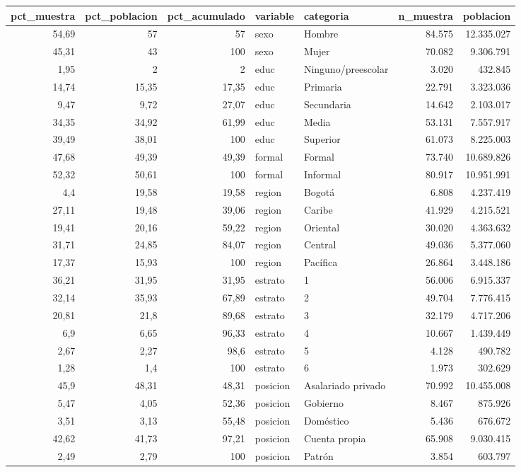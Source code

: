 \begin{tabular}{rrrllrr}
\toprule
pct\_muestra & pct\_poblacion & pct\_acumulado & variable & categoria & n\_muestra & poblacion \\
\midrule
54,69 & 57 & 57 & sexo & Hombre & 84.575 & 12.335.027 \\
45,31 & 43 & 100 & sexo & Mujer & 70.082 & 9.306.791 \\
1,95 & 2 & 2 & educ & Ninguno/preescolar & 3.020 & 432.845 \\
14,74 & 15,35 & 17,35 & educ & Primaria & 22.791 & 3.323.036 \\
9,47 & 9,72 & 27,07 & educ & Secundaria & 14.642 & 2.103.017 \\
34,35 & 34,92 & 61,99 & educ & Media & 53.131 & 7.557.917 \\
39,49 & 38,01 & 100 & educ & Superior & 61.073 & 8.225.003 \\
47,68 & 49,39 & 49,39 & formal & Formal & 73.740 & 10.689.826 \\
52,32 & 50,61 & 100 & formal & Informal & 80.917 & 10.951.991 \\
4,4 & 19,58 & 19,58 & region & Bogotá & 6.808 & 4.237.419 \\
27,11 & 19,48 & 39,06 & region & Caribe & 41.929 & 4.215.521 \\
19,41 & 20,16 & 59,22 & region & Oriental & 30.020 & 4.363.632 \\
31,71 & 24,85 & 84,07 & region & Central & 49.036 & 5.377.060 \\
17,37 & 15,93 & 100 & region & Pacífica & 26.864 & 3.448.186 \\
36,21 & 31,95 & 31,95 & estrato & 1 & 56.006 & 6.915.337 \\
32,14 & 35,93 & 67,89 & estrato & 2 & 49.704 & 7.776.415 \\
20,81 & 21,8 & 89,68 & estrato & 3 & 32.179 & 4.717.206 \\
6,9 & 6,65 & 96,33 & estrato & 4 & 10.667 & 1.439.449 \\
2,67 & 2,27 & 98,6 & estrato & 5 & 4.128 & 490.782 \\
1,28 & 1,4 & 100 & estrato & 6 & 1.973 & 302.629 \\
45,9 & 48,31 & 48,31 & posicion & Asalariado privado & 70.992 & 10.455.008 \\
5,47 & 4,05 & 52,36 & posicion & Gobierno & 8.467 & 875.926 \\
3,51 & 3,13 & 55,48 & posicion & Doméstico & 5.436 & 676.672 \\
42,62 & 41,73 & 97,21 & posicion & Cuenta propia & 65.908 & 9.030.415 \\
2,49 & 2,79 & 100 & posicion & Patrón & 3.854 & 603.797 \\
\bottomrule
\end{tabular}
